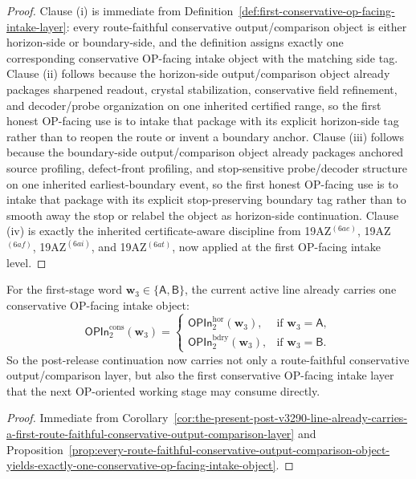 \begin{proof}
Clause (i) is immediate from Definition~\ref{def:first-conservative-op-facing-intake-layer}: every route-faithful conservative output/comparison object is either horizon-side or boundary-side, and the definition assigns exactly one corresponding conservative OP-facing intake object with the matching side tag. Clause (ii) follows because the horizon-side output/comparison object already packages sharpened readout, crystal stabilization, conservative field refinement, and decoder/probe organization on one inherited certified range, so the first honest OP-facing use is to intake that package with its explicit horizon-side tag rather than to reopen the route or invent a boundary anchor. Clause (iii) follows because the boundary-side output/comparison object already packages anchored source profiling, defect-front profiling, and stop-sensitive probe/decoder structure on one inherited earliest-boundary event, so the first honest OP-facing use is to intake that package with its explicit stop-preserving boundary tag rather than to smooth away the stop or relabel the object as horizon-side continuation. Clause (iv) is exactly the inherited certificate-aware discipline from 19AZ$^{(6ae)}$, 19AZ$^{(6af)}$, 19AZ$^{(6ai)}$, and 19AZ$^{(6at)}$, now applied at the first OP-facing intake level.
\end{proof}

\begin{corollary}
\label{cor:the-present-post-v3290-line-already-carries-a-first-conservative-op-facing-intake-layer}
For the first-stage word \(\mathbf w_3\in\{\mathsf A,\mathsf B\}\), the current active line already carries one conservative OP-facing intake object:
\[
  \mathsf{OPIn}^{\mathrm{cons}}_{2}(\mathbf w_3)
  =
  \begin{cases}
    \mathsf{OPIn}^{\mathrm{hor}}_{2}(\mathbf w_3), & \text{if }\mathbf w_3=\mathsf A,\\[2mm]
    \mathsf{OPIn}^{\mathrm{bdry}}_{2}(\mathbf w_3), & \text{if }\mathbf w_3=\mathsf B.
  \end{cases}
\]
So the post-release continuation now carries not only a route-faithful conservative output/comparison layer, but also the first conservative OP-facing intake layer that the next OP-oriented working stage may consume directly.
\end{corollary}

\begin{proof}
Immediate from Corollary~\ref{cor:the-present-post-v3290-line-already-carries-a-first-route-faithful-conservative-output-comparison-layer} and Proposition~\ref{prop:every-route-faithful-conservative-output-comparison-object-yields-exactly-one-conservative-op-facing-intake-object}.
\end{proof}

